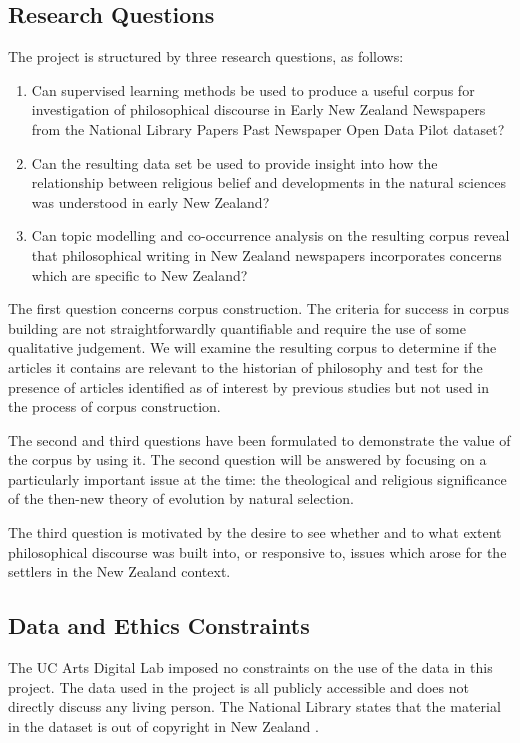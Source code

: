 \documentclass{article}
\begin{document}
\subsection{Research Questions}

The project is structured by three research questions, as follows:
\begin{enumerate}
  \item Can supervised learning methods be used to produce a useful corpus for investigation of philosophical discourse in Early New Zealand Newspapers from the National Library Papers Past Newspaper Open Data Pilot dataset?
  \item Can the resulting data set be used to provide insight into how the relationship between religious belief and developments in the natural sciences was understood in early New Zealand?
  \item Can topic modelling and co-occurrence analysis on the resulting corpus reveal that philosophical writing in New Zealand newspapers incorporates concerns which are specific to New Zealand?
\end{enumerate}

The first question concerns corpus construction. The criteria for success in corpus building are not straightforwardly quantifiable and require the use of some qualitative judgement.
We will examine the resulting corpus to determine if the articles it contains are relevant to the historian of philosophy and test for the presence of articles identified as of interest by previous studies but not used in the process of corpus construction.

The second and third questions have been formulated to demonstrate the value of the corpus by using it. The second question will be answered by focusing on a particularly important issue at the time: the theological and religious significance of the then-new theory of evolution by natural selection.

The third question is motivated by the desire to see whether and to what extent philosophical discourse was built into, or responsive to, issues which arose for the settlers in the New Zealand context.

\subsection{Data and Ethics Constraints}

The UC Arts Digital Lab imposed no constraints on the use of the data in this project. The data used in the project is all publicly accessible and does not directly discuss any living person. The National Library states that the material in the dataset is out of copyright in New Zealand \cite{ppnodp-copyright}.
\end{document}
